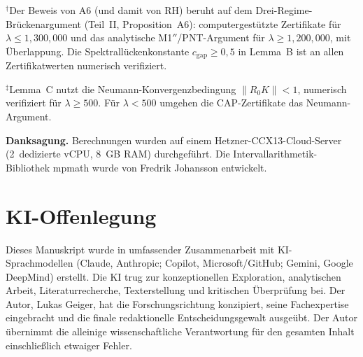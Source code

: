 \documentclass[12pt,a4paper]{article}
\theoremstyle{definition}
\theoremstyle{remark}
\begin{document}
\noindent${}^\dagger$Der Beweis von A6 (und damit von RH) beruht auf dem Drei-Regime-Brückenargument (Teil~II, Proposition~A6): computergestützte Zertifikate für $\lambda \leq 1{,}300{,}000$ und das analytische M1$''$/PNT-Argument für $\lambda \geq 1{,}200{,}000$, mit Überlappung. Die Spektrallückenkonstante $c_{\mathrm{gap}} \geq 0{,}5$ in Lemma~B ist an allen Zertifikatwerten numerisch verifiziert.

\noindent${}^\ddagger$Lemma~C nutzt die Neumann-Konvergenzbedingung $\|R_0 K\| < 1$, numerisch verifiziert für $\lambda \geq 500$. Für $\lambda < 500$ umgehen die CAP-Zertifikate das Neumann-Argument.

\bigskip
\noindent\textbf{Danksagung.} Berechnungen wurden auf einem Hetzner-CCX13-Cloud-Server (2~dedizierte vCPU, 8~GB RAM) durchgeführt. Die Intervallarithmetik-Bibliothek mpmath wurde von Fredrik Johansson entwickelt.


\section*{KI-Offenlegung}

Dieses Manuskript wurde in umfassender Zusammenarbeit mit KI-Sprachmodellen (Claude, Anthropic; Copilot, Microsoft/GitHub; Gemini, Google DeepMind) erstellt. Die KI trug zur konzeptionellen Exploration, analytischen Arbeit, Literaturrecherche, Texterstellung und kritischen Überprüfung bei. Der Autor, Lukas Geiger, hat die Forschungsrichtung konzipiert, seine Fachexpertise eingebracht und die finale redaktionelle Entscheidungsgewalt ausgeübt. Der Autor übernimmt die alleinige wissenschaftliche Verantwortung für den gesamten Inhalt einschließlich etwaiger Fehler.
\end{document}
